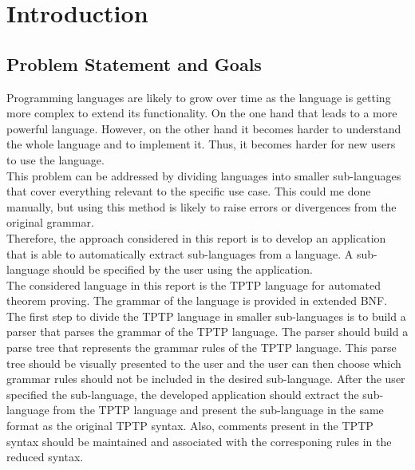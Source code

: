 
\chapter{Introduction}\label{cha:Introduction}

\section{Problem Statement and Goals}\label{sec:Aufgabenstellung}

Programming languages are likely to grow over time as the language is getting more complex to extend its functionality.
On the one hand that leads to a more powerful language. However, on the other hand it becomes harder to understand the whole language and to implement it.
Thus, it becomes harder for new users to use the language.\\
This problem can be addressed by dividing languages into smaller sub-languages that cover everything relevant to the specific use case. 
This could me done manually, but using this method is likely to raise errors or divergences from the original grammar.\\
Therefore, the approach considered in this report is to develop an application that is able to automatically extract sub-languages from a language.
A sub-language should be specified by the user using the application.\\
The considered language in this report is the \ac{TPTP} language for automated theorem proving.
The grammar of the language is provided in extended \ac{BNF}.\\
The first step to divide the \ac{TPTP} language in smaller sub-languages is to build a parser that parses the grammar of the \ac{TPTP} language.
The parser should build a parse tree that represents the grammar rules of the \ac{TPTP} language.
This parse tree should be visually presented to the user and the user can then choose which grammar rules should not be included in the desired sub-language.
After the user specified the sub-language, the developed application should extract the sub-language from the \ac{TPTP} language and present the sub-language in the same format as the original \ac{TPTP} syntax.
Also, comments present in the \ac{TPTP} syntax should be maintained and associated with the corresponing rules in the reduced syntax.



